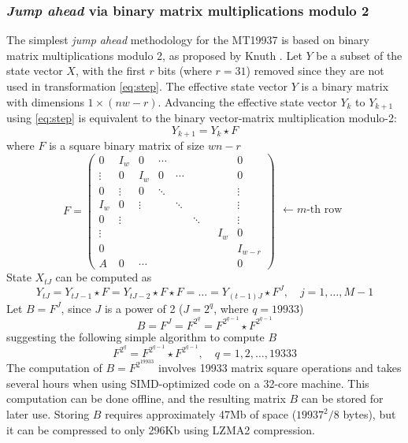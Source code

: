 \documentclass[preprint,1p,times]{elsarticle}
\begin{document}
\subsubsection{\textit{Jump ahead} via binary matrix multiplications modulo 2}
\label{sec:jumpahead}
\noindent The simplest \textit{jump ahead} methodology for the MT19937 is based on binary matrix multiplications modulo 2, as proposed by Knuth \cite{knuth}. Let $Y$ be a subset of the state vector $X$, with the first $r$ bits (where $r = 31$) removed since they are not used in transformation \eqref{eq:step}. 
The effective state vector $Y$ is a binary matrix with dimensions $1\times (nw-r)$. Advancing the effective state vector $Y_k$ to $Y_{k+1}$ using \eqref{eq:step} is equivalent to the binary vector-matrix multiplication modulo-2:
\begin{equation}
Y_{k+1} = Y_k \star F
\end{equation}
where $F$ is a square binary matrix of size $wn-r$
\begin{equation}
\label{eq:transmat}
    F = \begin{pmatrix}
        0 & I_w & 0 & \cdots & &  &  &  & 0 \\
        \vdots & 0 & I_w & 0 & \cdots & & & & 0\\
        0 & \vdots & 0 & \ddots & &&& & \vdots \\
        I_w & 0 & \vdots & & \ddots & && & \vdots \\
        0 & \vdots &  & & & \ddots & & & \vdots \\
        \vdots &  &  &  & &&& I_w & 0 \\
        0 &  &  & &  & &&&I_{w - r} \\
        A & 0 & \cdots & &  &  &&& 0
\end{pmatrix}
\begin{matrix}
\\ \\ \\ \leftarrow m\text{-th row} \\ \\ \\ \\
\end{matrix}
\end{equation}
State $X_{tJ}$ can be computed as
\begin{equation}
\label{eq:jumpahead}
    Y_{tJ} = Y_{tJ-1} \star F = Y_{tJ-2}  \star F \star F = \ldots = Y_{(t-1)J}  \star F^{J}, \quad j=1,\dots,M-1
\end{equation}
Let $B=F^J$, since $J$ is a power of 2 ($J=2^{q}$, where $q=19933$)
$$
    B=F^{J}=F^{2^q}=F^{2^{q-1}} \star F^{2^{q-1}}
$$
suggesting the following simple algorithm to compute $B$
$$
    F^{2^q} = F^{2^{q-1}} \star F^{2^{q-1}}, \quad q=1, 2, \dots, 19333
$$
The computation of $B=F^{2^{19933}}$ involves 19933 matrix square operations and takes several hours when using SIMD-optimized code on a 32-core machine. This computation can be done offline, and the resulting matrix $B$ can be stored for later use. Storing $B$ requires approximately 47Mb of space ($19937^2/8$ bytes), but it can be compressed to only 296Kb using LZMA2 compression.
\end{document}
